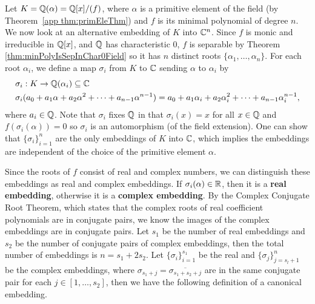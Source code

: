 \documentclass[../main.tex]{subfiles}
\begin{document}
Let $K = \mathbb{Q}(\alpha) = \mathbb{Q}[x]/(f)$, where $\alpha$ is a primitive element of the field (by Theorem~\ref{app thm:primEleThm}) and $f$ is its minimal polynomial of degree $n$.
We now look at an alternative embedding of $K$ into $\mathbb{C}^n$. 
Since $f$ is monic and irreducible in $\mathbb{Q}[x]$, and $\mathbb{Q}$ has characteristic 0, $f$ is separable by Theorem \ref{thm:minPolyIsSepInChar0Field} so it has $n$ distinct roots $\{ \alpha_1,\ldots,\alpha_n\}$.  
For each root $\alpha_i$, we define a map $\sigma_i$ from $K$ to $\mathbb{C}$ sending $\alpha$ to $\alpha_i$ by 
\begin{align*}
&\sigma_i: K \rightarrow \mathbb{Q}(\alpha_i) \subseteq \mathbb{C} \\
& \sigma_i(a_0 + a_1\alpha + a_2 \alpha^2 + \cdots + a_{n-1} \alpha^{n-1}) = 
  a_0 + a_1\alpha_i + a_2 \alpha_i^2 + \cdots + a_{n-1}\alpha_i^{n-1},
\end{align*}
where $a_i \in \mathbb{Q}$. 
Note that $\sigma_i$ fixes $\mathbb{Q}$ in that $\sigma_i(x)= x$ for all $x \in \mathbb{Q}$ and $f(\sigma_i(\alpha)) = 0$ so $\sigma_i$ is an automorphism  (of the field extension). 
One can show that $\{ \sigma_i \}_{i=1}^n$ are the only embeddings of $K$ into $\mathbb{C}$, which implies the embeddings are independent of the choice of the primitive element $\alpha$.

Since the roots of $f$ consist of real and complex numbers, we can distinguish these embeddings as real and complex embeddings. If $\sigma_i(\alpha) \in \mathbb{R}$, then it is a \textbf{real embedding}, otherwise it is a \textbf{complex embedding}. 
By the Complex Conjugate Root Theorem, which states that the complex roots of real coefficient polynomials are in conjugate pairs, we know the images of the complex embeddings are in conjugate pairs. Let $s_1$ be the number of real embeddings and $s_2$ be the number of conjugate pairs of complex embeddings, then the total number of embeddings is $n=s_1 + 2s_2$. Let $\{\sigma_i\}_{i = 1}^{s_1}$ be the real and $\{\sigma_j\}_{j = s_l+1}^{n}$ be the complex embeddings, where $\sigma_{s_1 + j} = \overline{\sigma_{s_1 + s_2 + j}}$ are in the same conjugate pair for each $j \in [1,\ldots,s_2]$, then we have the following definition of a canonical embedding. 
\end{document}

